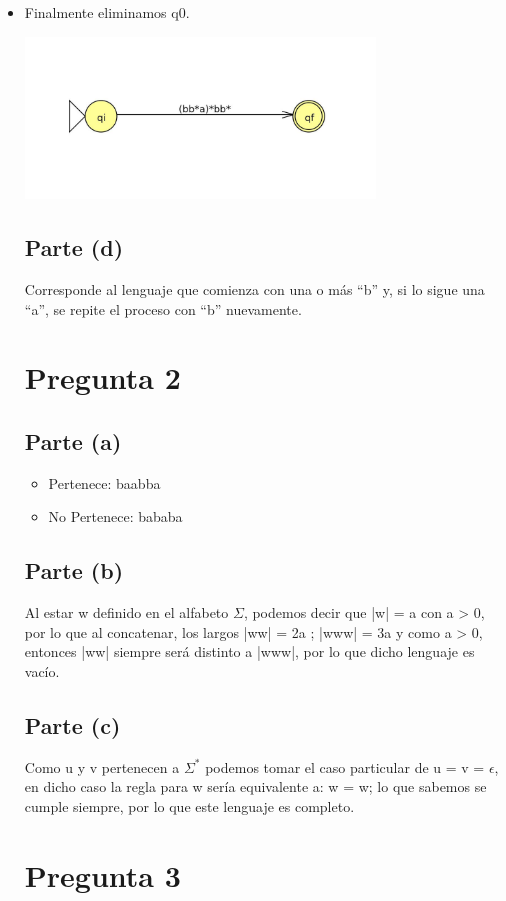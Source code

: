 \documentclass[11pt,letterpaper]{article}
\begin{document}
\begin{itemize}
\begin{center}
\end{center}
\item{Finalmente eliminamos q0.}
\begin{center}
\includegraphics[height=4.3cm]{tarea1-c4.png}
\end{center}

\subsection{Parte (d)}
Corresponde al lenguaje que comienza con una o más ``b'' y, si lo sigue una ``a'', se repite el proceso con ``b'' nuevamente.

\section{Pregunta 2}
\subsection{Parte (a)}
\begin{itemize}
\item{Pertenece: baabba}
\item{No Pertenece: bababa}
\end{itemize}
\subsection{Parte (b)}
Al estar w definido en el alfabeto $\Sigma$, podemos decir que |w| = a con a > 0, por lo que al concatenar, los largos |ww| = 2a ; |www| = 3a y como a > 0, entonces |ww| siempre será distinto a |www|, por lo que dicho lenguaje es vacío.
\subsection{Parte (c)}
Como u y v pertenecen a $\Sigma ^*$ podemos tomar el caso particular de u = v = $\epsilon$, en dicho caso la regla para w sería equivalente a: w = w; lo que sabemos se cumple siempre, por lo que este lenguaje es completo.

\section{Pregunta 3}

\end{itemize}
\end{document}
